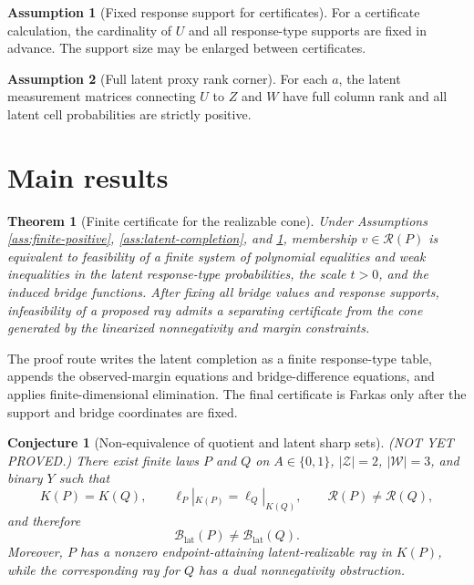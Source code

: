 \documentclass[11pt]{article}
\newcommand{\calR}{\mathcal{R}}
\theoremstyle{definition}
\newtheorem{assumption}{Assumption}
\theoremstyle{plain}
\newtheorem{theorem}{Theorem}
\newtheorem{conjecture}{Conjecture}
\theoremstyle{remark}
\begin{document}
\begin{assumption}[Fixed response support for certificates]\label{ass:fixed-support}
For a certificate calculation, the cardinality of \(U\) and all response-type supports are fixed in advance. The support size may be enlarged between certificates.
\end{assumption}

\begin{assumption}[Full latent proxy rank corner]\label{ass:full-rank-corner}
For each \(a\), the latent measurement matrices connecting \(U\) to \(Z\) and \(W\) have full column rank and all latent cell probabilities are strictly positive.
\end{assumption}

\section{Main results}
\begin{theorem}[Finite certificate for the realizable cone]\label{thm:certificate}
Under Assumptions \ref{ass:finite-positive}, \ref{ass:latent-completion}, and \ref{ass:fixed-support}, membership \(v\in\calR(P)\) is equivalent to feasibility of a finite system of polynomial equalities and weak inequalities in the latent response-type probabilities, the scale \(t>0\), and the induced bridge functions. After fixing all bridge values and response supports, infeasibility of a proposed ray admits a separating certificate from the cone generated by the linearized nonnegativity and margin constraints.
\end{theorem}
The proof route writes the latent completion as a finite response-type table, appends the observed-margin equations and bridge-difference equations, and applies finite-dimensional elimination. The final certificate is Farkas only after the support and bridge coordinates are fixed.

\begin{conjecture}[Non-equivalence of quotient and latent sharp sets]\label{conj:nonequiv}
(NOT YET PROVED.) There exist finite laws \(P\) and \(Q\) on \(A\in\{0,1\}\), \(|\mathcal{Z}|=2\), \(|\mathcal{W}|=3\), and binary \(Y\) such that
\[
K(P)=K(Q),\qquad \ell_P|_{K(P)}=\ell_Q|_{K(Q)},\qquad \calR(P)\neq \calR(Q),
\]
and therefore
\[
\mathcal{B}_{\mathrm{lat}}(P)\neq \mathcal{B}_{\mathrm{lat}}(Q).
\]
Moreover, \(P\) has a nonzero endpoint-attaining latent-realizable ray in \(K(P)\), while the corresponding ray for \(Q\) has a dual nonnegativity obstruction.
\end{conjecture}
\end{document}
